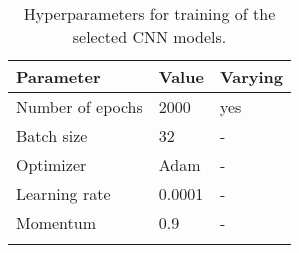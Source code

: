 \begin{table}[ht!]
\small
\begin{center}
\caption{Hyperparameters for training of the selected CNN models.}
\begin{tabular}{ M{6cm}  M{2cm} M{2cm}}
\toprule
\textbf{Parameter} & \textbf{Value} & \textbf{Varying} \\
\midrule
Number of epochs & 2000 & yes\\
Batch size & 32 & -\\
\midrule
Optimizer & Adam & -\\
Learning rate & 0.0001 & -\\
Momentum & 0.9 & -\\
\bottomrule
\label{tab:exp_details_params_train}
\end{tabular}
\end{center}
\vspace{-4mm}
\end{table}
\FloatBarrier
\noindent